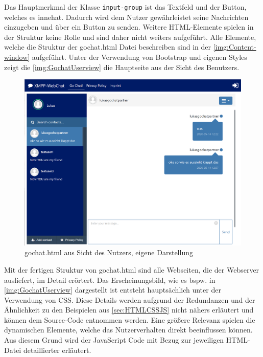 \documentclass[a4paper,titlepage,halfparskip,12pt]{scrreprt}
\begin{document}
\begin{onehalfspacing}
Das Hauptmerkmal der Klasse \texttt{input-group} ist das Textfeld und der Button, welches es innehat. Dadurch wird dem Nutzer gewährleistet seine Nachrichten einzugeben und über ein Button zu senden. Weitere HTML-Elemente spielen in der Struktur keine Rolle und sind daher nicht weiters aufgeführt. Alle Elemente, welche die Struktur der gochat.html Datei beschreiben sind in der \autoref{img:Content-window} aufgeführt. Unter der Verwendung von Bootstrap und eigenen Styles zeigt die \autoref{img:GochatUserview} die Hauptseite aus der Sicht des Benutzers.
\begin{figure}[h]
	\centering
	\includegraphics[scale=0.4]{images/GochatUserAnsicht}
	\caption{gochat.html aus Sicht des Nutzers, eigene Darstellung}
	\label{img:GochatUserview}
\end{figure}
Mit der fertigen Struktur von gochat.html sind alle Webseiten, die der Webserver ausliefert, im Detail erörtert. Das Erscheinungsbild, wie es bspw. in \autoref{img:GochatUserview} dargestellt ist entsteht hauptsächlich unter der Verwendung von \ac{CSS}. Diese Details werden aufgrund der Redundanzen und der Ähnlichkeit zu den Beispielen aus \autoref{sec:HTMLCSSJS} nicht nähers erläutert und können dem Source-Code entnommen werden. Eine größere Relevanz spielen die dynamischen Elemente, welche das Nutzerverhalten direkt beeinflussen können. Aus diesem Grund wird der JavaScript Code mit Bezug zur jeweiligen HTML-Datei detaillierter erläutert.
\pagebreak


\end{onehalfspacing}
\end{document}
